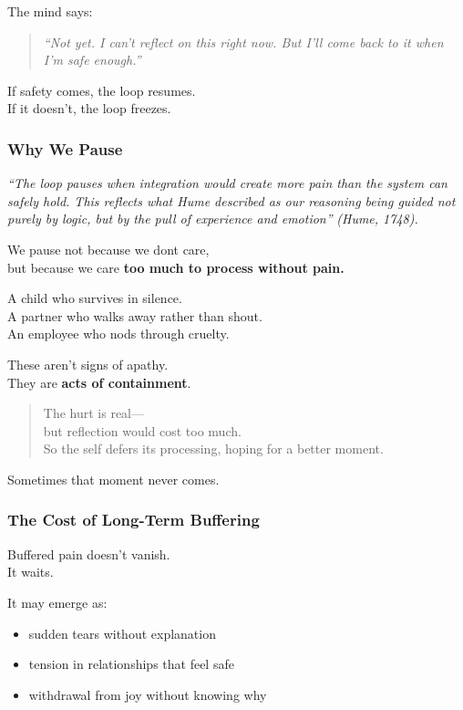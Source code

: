 The mind says:

\begin{quote}
\emph{``Not yet. I can't reflect on this right now. But I'll come back
to it when I'm safe enough.''}
\end{quote}

If safety comes, the loop resumes.\\
If it doesn't, the loop freezes.

\subsubsection{\texorpdfstring{\textbf{Why We
Pause}}{Why We Pause}}\label{why-we-pause}

\emph{``The loop pauses when integration would create more pain than the
system can safely hold. This reflects what Hume described as our
reasoning being guided not purely by logic, but by the pull of
experience and emotion''} \emph{(Hume, 1748).}

We pause not because we don\textquotesingle t care,\\
but because we care \textbf{too much to process without pain.}

A child who survives in silence.\\
A partner who walks away rather than shout.\\
An employee who nods through cruelty.

These aren't signs of apathy.\\
They are \textbf{acts of containment}.

\begin{quote}
The hurt is real---\\
but reflection would cost too much.\\
So the self defers its processing, hoping for a better moment.
\end{quote}

Sometimes that moment never comes.

\subsubsection{\texorpdfstring{\textbf{The Cost of Long-Term
Buffering}}{The Cost of Long-Term Buffering}}\label{the-cost-of-long-term-buffering}

Buffered pain doesn't vanish.\\
It waits.

It may emerge as:

\begin{itemize}
\item
  sudden tears without explanation
\item
  tension in relationships that feel safe
\item
  withdrawal from joy without knowing why
\end{itemize}

